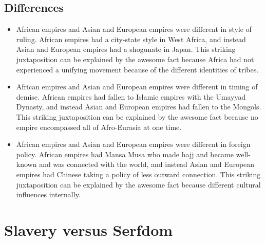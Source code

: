 \documentclass[letterpaper, 10pt]{article}
\begin{document}
            \subsection{Differences}
                \begin{itemize}
                    \item African empires and Asian and European empires were different in style of ruling. African empires had a city-state style in West Africa, and instead Asian and European empires had a shogunate in Japan. This striking juxtaposition can be explained by the awesome fact because Africa had not experienced a unifying movement because of the different identities of tribes.
                    \item African empires and Asian and European empires were different in timing of demise. African empires had fallen to Islamic empires with the Umayyad Dynasty, and instead Asian and European empires had fallen to the Mongols. This striking juxtaposition can be explained by the awesome fact because no empire encompassed all of Afro-Eurasia at one time.
                    \item African empires and Asian and European empires were different in foreign policy. African empires had Mansa Musa who made hajj and became well-known and was connected with the world, and instead Asian and European empires had Chinese taking a policy of less outward connection. This striking juxtaposition can be explained by the awesome fact because different cultural influences internally.
                \end{itemize}
        \section{Slavery versus Serfdom}
\end{document}

